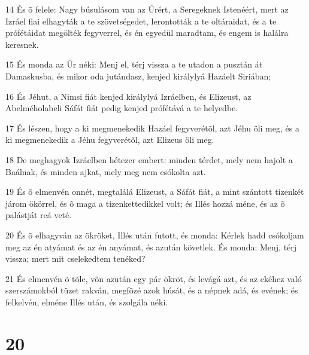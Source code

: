 \par 14 És õ felele: Nagy búsulásom van az Úrért, a Seregeknek Istenéért, mert az Izráel fiai elhagyták a te szövetségedet, lerontották a te oltáraidat, és a te prófétáidat megölték fegyverrel, és én egyedül maradtam, és engem is halálra keresnek.
\par 15 És monda az Úr néki: Menj el, térj vissza a te utadon a pusztán át Damaskusba, és mikor oda jutándasz, kenjed királylyá Hazáelt Siriában;
\par 16 És Jéhut, a Nimsi fiát kenjed királylyá Izráelben, és Elizeust, az Abelméholabeli Sáfát fiát pedig kenjed prófétává a te helyedbe.
\par 17 És lészen, hogy a ki megmenekedik Hazáel fegyverétõl, azt Jéhu öli meg, és a ki megmenekedik a Jéhu fegyverétõl, azt Elizeus öli meg.
\par 18 De meghagyok Izráelben hétezer embert: minden térdet, mely nem hajolt a Baálnak, és minden ajkat, mely meg nem csókolta azt.
\par 19 És õ elmenvén onnét, megtalálá Elizeust, a Sáfát fiát, a mint szántott tizenkét járom ökörrel, és õ maga a tizenkettedikkel volt; és Illés hozzá méne, és az õ palástját reá veté.
\par 20 És õ elhagyván az ökröket, Illés után futott, és monda: Kérlek hadd csókoljam meg az én atyámat és az én anyámat, és azután követlek. És monda: Menj, térj vissza; mert mit cselekedtem tenéked?
\par 21 És elmenvén õ tõle, võn azután egy pár ökröt, és levágá azt, és az ekéhez való szerszámokból tüzet rakván, megfõzé azok húsát, és a népnek adá, és evének; és felkelvén, elméne Illés után, és szolgála néki.

\chapter{20}

